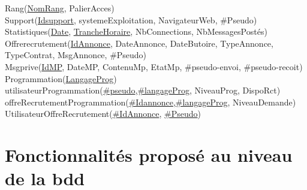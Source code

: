 \documentclass{report}
\begin{document}
Rang(\underline{NomRang}, PalierAcces)\\

Support(\underline{Idsupport}, systemeExploitation, NavigateurWeb, \#Pseudo)\\

Statistiques(\underline{Date}, \underline{TrancheHoraire}, NbConnections, NbMessagesPostés)\\


Offrerecrutement(\underline{IdAnnonce}, DateAnnonce, DateButoire, TypeAnnonce, TypeContrat, MsgAnnonce, \#Pseudo)\\

Msgprive(\underline{IdMP}, DateMP, ContenuMp, EtatMp, \#pseudo-envoi, \#pseudo-recoit)\\

Programmation(\underline{LangageProg})\\

utilisateurProgrammation(\underline{\#pseudo},\underline{\#langageProg}, NiveauProg, DispoRct)\\

offreRecrutementProgrammation(\underline{\#Idannonce},\underline{\#langageProg}, NiveauDemande)\\

UtilisateurOffreRecrutement(\underline{\#IdAnnonce}, \underline{\#Pseudo})

\chapter{Fonctionnalités proposé au niveau de la bdd}
\end{document}
